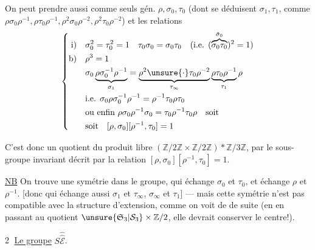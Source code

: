 
On peut prendre aussi comme seuls gén. $\rho,\sigma_0,\tau_0$ (dont se déduisent $\sigma_1,\tau_1$, \inserted{$\sigma_\infty,\tau_\infty$,} comme $\rho\sigma_0\rho^{-1},\rho\tau_0\rho^{-1},\rho^2\sigma_0\rho^{-2},\rho^2\tau_0\rho^{-2}$) et les relations
\[
\left\{\begin{aligned}
\text{i)}\quad&\sigma_0^2=\tau_0^2=1\quad\tau_0\sigma_0=\sigma_0\tau_0\quad\text{(i.e. }(\overbrace{\sigma_0\tau_0}^{\tilde\sigma_0})^2=1\text{)}\\
\text{b)}\quad&\rho^3=1\\
&\sigma_0\underbrace{\rho\sigma_0^{-1}\rho^{-1}}_{\sigma_1}=\underbrace{\rho^2\unsure{\cdot}\tau_0\rho^{-2}}_{\tau_\infty}\underbrace{\rho\tau_0\rho^{-1}}_{\tau_1}\rho\\
&\text{i.e. }\sigma_0\rho\sigma_0^{-1}\rho^{-1}=\rho^{-1}\tau_0\rho\tau_0\\
&\text{ou enfin }\rho\sigma_0\rho^{-1}\sigma_0=\tau_0\rho^{-1}\tau_0\rho\quad\text{soit}\\
&\text{soit}\quad[\rho,\sigma_0][\rho^{-1},\tau_0]=1
\end{aligned}\right.
\]

C'est donc un quotient du produit libre $(\mathbb Z/2\mathbb Z\times\mathbb Z/2\mathbb Z)*\mathbb Z/3\mathbb Z$, par le sous-groupe invariant décrit par la relation $[\rho,\sigma_0][\rho^{-1},\tau_0]=1$.

\uline{NB} On trouve une symétrie dans le groupe, qui échange $\sigma_0$ et $\tau_0$, et échange $\rho$ et $\rho^{-1}$. [donc qui échange aussi $\sigma_1$ et $\tau_\infty$, $\sigma_\infty$ et $\tau_1$] --- mais cette symétrie n'est pas compatible avec la structure d'extension, comme on voit de  de suite (en en passant au quotient $\unsure{\mathfrak S_3|\mathcal S_3}\times\mathbb Z/2$, elle devrait conserver le centre!).

\textcircled{2} \uline{Le groupe} $S\widehat{\widehat{\mathcal E}}$.

